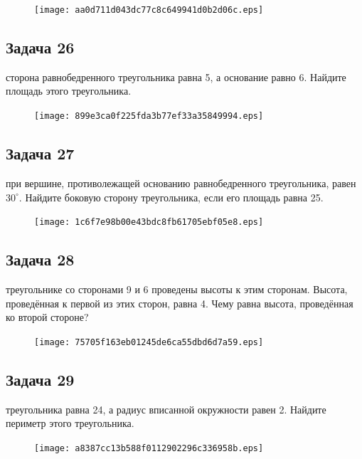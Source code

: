 \documentclass[a4paper,10pt]{article} %
\begin{document}
\begin{spacing}{1.0}
{\begin{figure}{\texttt{[image: aa0d711d043dc77c8c649941d0b2d06c.eps]}}\end{figure}
\subsection*{Задача 26}
 сторона равнобедренного треугольника равна 5, а основание равно 6. Найдите площадь этого треугольника.

\vspace{1.5cm}

\begin{figure}{\texttt{[image: 899e3ca0f225fda3b77ef33a35849994.eps]}}\end{figure}
\subsection*{Задача 27}
 при вершине, противолежащей основанию равнобедренного треугольника, равен $30^\circ$. Найдите боковую сторону треугольника, если его площадь равна 25.

\vspace{1.5cm}

\begin{figure}{\texttt{[image: 1c6f7e98b00e43bdc8fb61705ebf05e8.eps]}}\end{figure}
\subsection*{Задача 28}
 треугольнике со сторонами 9 и 6 проведены высоты к этим сторонам. Высота, проведённая к первой из этих сторон, равна 4. Чему равна высота, проведённая ко второй стороне? 

\vspace{1.5cm}

\begin{figure}{\texttt{[image: 75705f163eb01245de6ca55dbd6d7a59.eps]}}\end{figure}
\subsection*{Задача 29}
 треугольника равна 24, а радиус вписанной окружности равен 2. Найдите периметр этого треугольника. 

\vspace{1.5cm}

\begin{figure}{\texttt{[image: a8387cc13b588f0112902296c336958b.eps]}}\end{figure}
}
\end{spacing}
\end{document}
